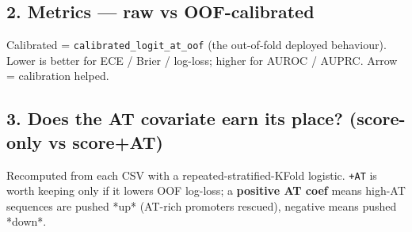 \documentclass[10pt]{article}
\begin{document}
\subsection*{2. Metrics --- raw vs OOF-calibrated}

Calibrated = \texttt{calibrated\_logit\_at\_oof} (the out-of-fold deployed behaviour). Lower is better for ECE / Brier / log-loss; higher for AUROC / AUPRC. Arrow = calibration helped.

\begin{center}
\end{center}

\subsection*{3. Does the AT covariate earn its place? (score-only vs score+AT)}

Recomputed from each CSV with a repeated-stratified-KFold logistic. \texttt{+AT} is worth keeping only if it lowers OOF log-loss; a \textbf{positive AT coef} means high-AT sequences are pushed *up* (AT-rich promoters rescued), negative means pushed *down*.
\end{document}
